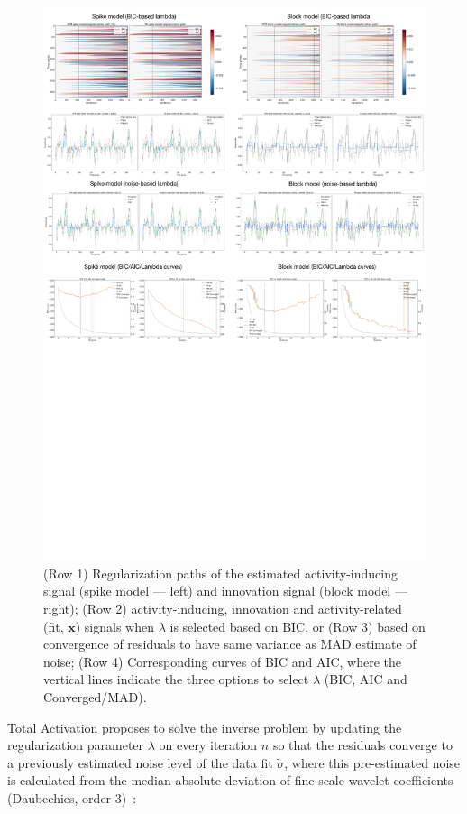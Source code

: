 \begin{figure}[t!]
    \begin{center}
        \includegraphics[width=\textwidth]{figures/exp.pdf}
    \end{center}
    \caption{(Row 1) Regularization paths of the estimated activity-inducing signal (spike model --- left) and innovation signal (block model --- right); (Row 2) activity-inducing, innovation and activity-related (fit, \(\mathbf{x}\)) signals when \(\lambda\) is selected based on BIC, or (Row 3) based on convergence of residuals to have same variance as MAD estimate of noise; (Row 4) Corresponding curves of BIC and AIC, where the vertical lines indicate the three options to select \(\lambda\) (BIC, AIC and Converged/MAD).}
\label{fig:exp}
\end{figure}

Total Activation proposes to solve the inverse problem by updating the regularization parameter \(\lambda\) on every iteration \(n\) so that the residuals converge to a previously estimated noise level of the data fit \(\tilde{\sigma}\), where this pre-estimated noise is calculated from the median absolute deviation of fine-scale wavelet coefficients (Daubechies, order 3)~\cite{karahanoglu2013TotalActivationFMRI}:

